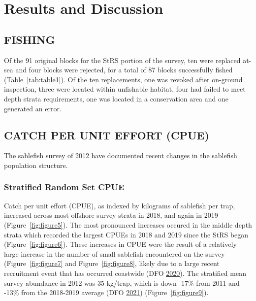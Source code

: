 \documentclass[12pt]{article}\usepackage[]{graphicx}\usepackage[]{color}
\begin{document}
\clearpage

\hypertarget{results-and-discussion}{%
\section{Results and Discussion}\label{results-and-discussion}}

\hypertarget{fishing}{%
\subsection{FISHING}\label{fishing}}

Of the 91 original blocks for the StRS portion of the survey, ten were replaced at-sea and four blocks were rejected, for a total of 87 blocks successfully fished (Table~\ref{tab:table1}). Of the ten replacements, one was revoked after on-ground inspection, three were located within unfishable habitat, four had failed to meet depth strata requirements, one was located in a conservation area and one generated an error.

\hypertarget{catch-per-unit-effort-cpue}{%
\subsection{CATCH PER UNIT EFFORT (CPUE)}\label{catch-per-unit-effort-cpue}}

The sablefish survey of 2012 have documented recent changes in the sablefish population structure.

\hypertarget{stratified-random-set-cpue}{%
\subsubsection{Stratified Random Set CPUE}\label{stratified-random-set-cpue}}

Catch per unit effort (CPUE), as indexed by kilograms of sablefish per trap, increased across most offshore survey strata in 2018, and again in 2019 (Figure~\ref{fig:figure5}). The most pronounced increases occured in the middle depth strata which recorded the largest CPUEs in 2018 and 2019 since the StRS began (Figure~\ref{fig:figure6}). These increases in CPUE were the result of a relatively large increase in the number of small sablefish encountered on the survey (Figure~\ref{fig:figure7} and Figure~\ref{fig:figure8}, likely due to a large recent recruitment event that has occurred coastwide (DFO \protect\hyperlink{ref-DFO2020}{2020}). The stratified mean survey abundance in 2012 was 35 kg/trap, which is down -17\% from 2011 and -13\% from the 2018-2019 average (DFO \protect\hyperlink{ref-DFO2021}{2021}) (Figure~\ref{fig:figure9}).
\end{document}
